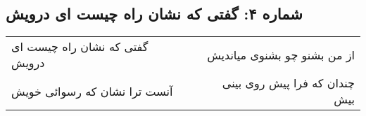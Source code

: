 \begin{center}
\section*{شماره ۴: گفتی که نشان راه چیست ای درویش}
\label{sec:004}
\begin{longtable}{l p{0.5cm} r}
گفتی که نشان راه چیست ای درویش
&&
از من بشنو چو بشنوی میاندیش
\\
آنست ترا نشان که رسوائی خویش
&&
چندان که فرا پیش روی بینی بیش
\\
\end{longtable}
\end{center}
